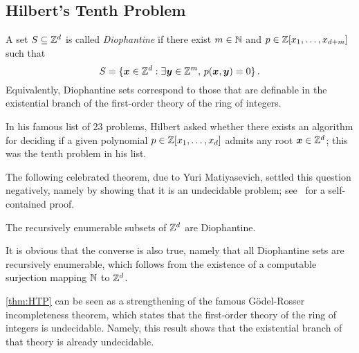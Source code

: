 \subsection{Hilbert's Tenth Problem}

A set $S \subseteq \mathbb{Z}^{d}$ is called \emph{Diophantine} if there exist $m \in \mathbb{N}$ and $p \in \mathbb{Z}[x_{1}, \ldots, x_{d+m}]$ such that
\[ S = \lbrace \boldsymbol{x} \in \mathbb{Z}^{d} : \exists \boldsymbol{y} \in \mathbb{Z}^{m}, \, p(\boldsymbol{x}, \boldsymbol{y}) = 0 \rbrace \, . \]
Equivalently, Diophantine sets correspond to those that are definable in the existential branch of the first-order theory of the ring of integers.

In his famous list of 23 problems, Hilbert asked whether there exists an algorithm for deciding if a given polynomial $p \in \mathbb{Z}[x_{1}, \ldots, x_{d}]$ admits any root $\boldsymbol{x} \in \mathbb{Z}^{d}$; this was the tenth problem in his list.

The following celebrated theorem, due to Yuri Matiyasevich, settled this question negatively, namely by showing that it is an undecidable problem; see~\cite{HTP} for a self-contained proof.

\begin{theorem}[Matiyasevich]
\label{thm:HTP}
The recursively enumerable subsets of $\mathbb{Z}^{d}$ are Diophantine.
\end{theorem}

It is obvious that the converse is also true, namely that all Diophantine sets are recursively enumerable, which follows from the existence of a computable surjection mapping $\mathbb{N}$ to $\mathbb{Z}^{d}$.

\cref{thm:HTP} can be seen as a strengthening of the famous G\"{o}del-Rosser incompleteness theorem, which states that the first-order theory of the ring of integers is undecidable. Namely, this result shows that the existential branch of that theory is already undecidable.
